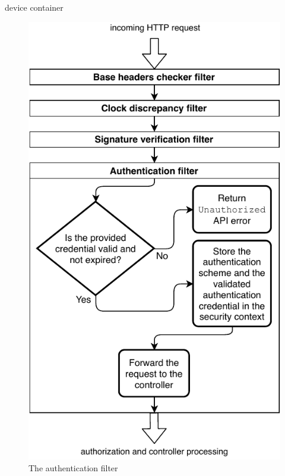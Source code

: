 device container

\begin{figure}[!htb]
    \includegraphics[width=\textwidth]{figures/authentication-filter.pdf}
    \caption{The authentication filter}
    \label{fig:authentication-filter}
\end{figure}

